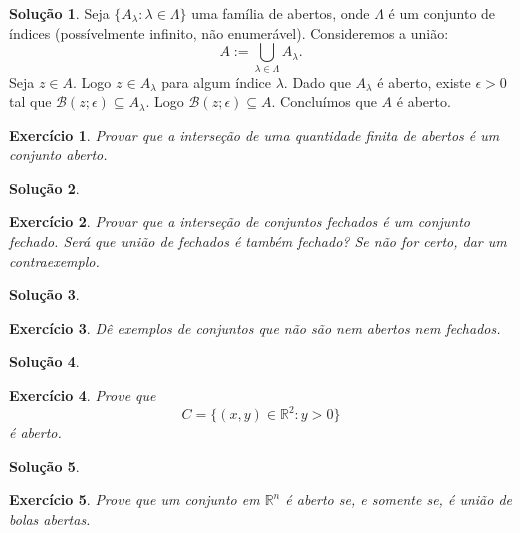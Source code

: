\documentclass[a4paper,12pt]{article}
\newcommand{\R}{\mathbb{R}}
\newcommand{\B}{\mathcal{B}}
\theoremstyle{exer}
\newtheorem{exercise}{Exercício}
\theoremstyle{definition}
\newtheorem{solution}{Solução}
\theoremstyle{plain}
\begin{document}
\begin{solution}
    Seja $\{A_{\lambda} : \lambda \in \Lambda\}$ uma família de abertos, onde
    $\Lambda$ é um conjunto de índices (possívelmente infinito, não
    enumerável). Consideremos a união:
    $$
    A := \bigcup_{\lambda \in \Lambda} A_{\lambda}.
    $$
    Seja $z \in A$. Logo $z \in A_{\lambda}$ para algum índice $\lambda$. Dado
    que $A_{\lambda}$ é aberto, existe $\epsilon > 0$ tal que $\B(z; \epsilon)
    \subseteq A_{\lambda}$. Logo $\B(z; \epsilon) \subseteq A$. Concluímos que $A$ é aberto.
\end{solution}

\begin{exercise}
    Provar que a interseção de uma quantidade finita de abertos é um conjunto aberto.
\end{exercise}

\begin{solution}

\end{solution}

\begin{exercise}
    Provar que a interseção de conjuntos fechados é um conjunto fechado. Será que união de fechados é também fechado? Se não for certo, dar um contraexemplo.
\end{exercise}

\begin{solution}

\end{solution}

\begin{exercise}
    Dê exemplos de conjuntos que não são nem abertos nem fechados.
\end{exercise}

\begin{solution}

\end{solution}

\begin{exercise}
    Prove que 
    $$C = \{(x, y) \in \R^2 : y > 0\}$$
    é aberto.
\end{exercise}

\begin{solution}
 
\end{solution}

\begin{exercise}
    Prove que um conjunto em $\R^n$ é aberto se, e somente se, é união de bolas abertas.
\end{exercise}
\end{document}
